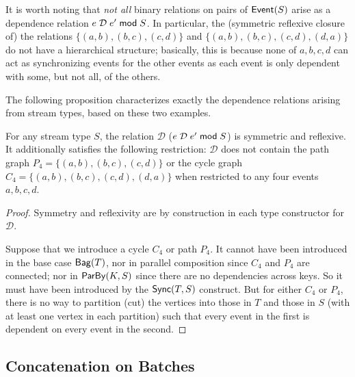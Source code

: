 It is worth noting that \emph{not all} binary relations on pairs of $\mathsf{Event}(S)$ arise as a dependence relation $e \;\mathcal{D}\; e' \;\mathsf{mod}\; {S}$.
In particular, the (symmetric reflexive closure of)
the relations $\{(a, b), (b, c), (c, d)\}$
and $\{(a, b), (b, c), (c, d), (d, a)\}$
do not have a hierarchical structure;
basically, this is because none of $a, b, c, d$ can act as synchronizing
events for the other events as each event is only dependent with some, but not all, of the others.

The following proposition
characterizes exactly the dependence relations arising from stream types, based on these two examples.
\begin{proposition}
\label{prop:stream-types-less-general}
For any stream type $S$, the relation $\mathcal{D}$ ($e \;\mathcal{D}\; e' \;\mathsf{mod}\; {S}$) is symmetric and reflexive.
It additionally satisfies the following restriction:
$\mathcal{D}$ does not contain the path graph $P_4 = \{(a, b), (b, c), (c, d)\}$
or the cycle graph $C_4 = \{(a, b), (b, c), (c, d), (d, a)\}$ when restricted
to any four events $a, b, c, d$.
\end{proposition}
\begin{proof}
Symmetry and reflexivity are by construction in each type constructor for
$\mathcal{D}$.

Suppose that we introduce a cycle $C_4$ or path $P_4$.
It cannot have been introduced in the base case $\mathsf{Bag}({T})$,
nor in parallel composition since $C_4$ and $P_4$ are connected;
nor in $\mathsf{ParBy}({K}, S)$ since there are no dependencies across keys.
So it must have been introduced by the $\mathsf{Sync}({T}, S)$ construct.
But for either $C_4$ or $P_4$, there is no way to partition (cut) the vertices into those in
$T$ and those in $S$ (with at least one vertex in each partition) such that every event in the first is
dependent on every event in the second.
\end{proof}

\subsection{Concatenation on Batches}

